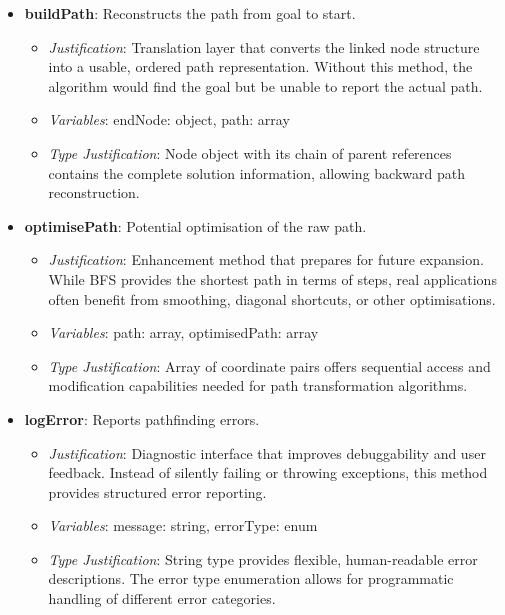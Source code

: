 \begin{itemize}
  \item \textbf{buildPath}: Reconstructs the path from goal to start.
    \begin{itemize}
      \item \textit{Justification}: Translation layer that converts the linked node structure into a usable, ordered path representation. Without this method, the algorithm would find the goal but be unable to report the actual path.
      \item \textit{Variables}: endNode: object, path: array
      \item \textit{Type Justification}: Node object with its chain of parent references contains the complete solution information, allowing backward path reconstruction.
    \end{itemize}
    
  \item \textbf{optimisePath}: Potential optimisation of the raw path.
    \begin{itemize}
      \item \textit{Justification}: Enhancement method that prepares for future expansion. While BFS provides the shortest path in terms of steps, real applications often benefit from smoothing, diagonal shortcuts, or other optimisations.
      \item \textit{Variables}: path: array, optimisedPath: array
      \item \textit{Type Justification}: Array of coordinate pairs offers sequential access and modification capabilities needed for path transformation algorithms.
    \end{itemize}
    
  \item \textbf{logError}: Reports pathfinding errors.
    \begin{itemize}
      \item \textit{Justification}: Diagnostic interface that improves debuggability and user feedback. Instead of silently failing or throwing exceptions, this method provides structured error reporting.
      \item \textit{Variables}: message: string, errorType: enum
      \item \textit{Type Justification}: String type provides flexible, human-readable error descriptions. The error type enumeration allows for programmatic handling of different error categories.
    \end{itemize}
\end{itemize}

